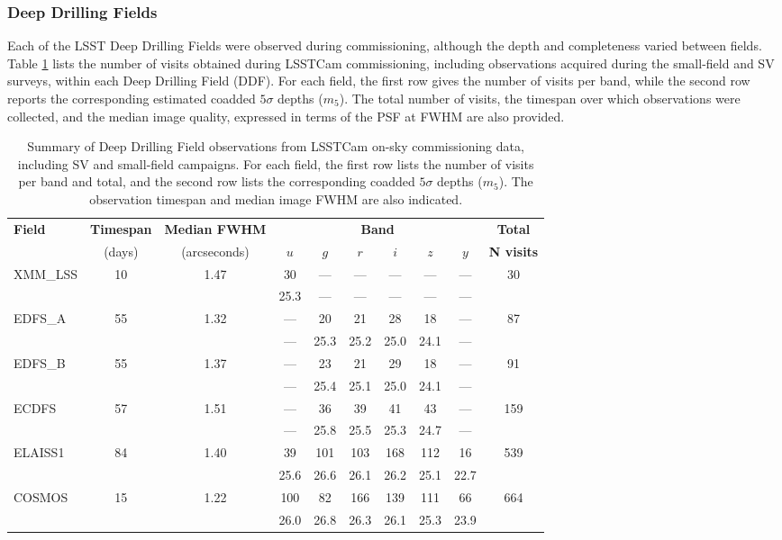 \subsubsection{Deep Drilling Fields}
Each of the LSST Deep Drilling Fields were observed during commissioning, although the depth and completeness  varied between fields.
Table \ref{tab:sv_ddf_summary}  lists the number of visits obtained during LSSTCam commissioning, including observations acquired during the  small-field  and SV surveys, within each Deep Drilling Field (DDF).
For each field, the first row gives the number of visits per band, while the second row reports the corresponding estimated coadded $5\sigma$ depths ($m_5$).
The total number of visits, the timespan over which observations were collected, and the median image quality, expressed in terms of the PSF at FWHM are also provided.
\begin{table}[htb]
\centering
\renewcommand{\arraystretch}{1.2}
\begin{tabular}{lccccccccc}
\toprule
\textbf{Field} &
\textbf{Timespan} &
\textbf{Median FWHM} &
\multicolumn{6}{c}{\textbf{Band}} &
\textbf{Total} \\
\cmidrule(lr){4-9}
 & (days) & (arcseconds) & $u$ & $g$ & $r$ & $i$ & $z$ & $y$ & \textbf{N visits} \\
\midrule
XMM\_LSS  & 10 & 1.47 & 30 & — & — & — & — & — & 30 \\
           &    &      & 25.3 & — & — & — & — & — &  \\
\addlinespace
EDFS\_A   & 55 & 1.32 & — & 20 & 21 & 28 & 18 & — & 87 \\
           &    &      & — & 25.3 & 25.2 & 25.0 & 24.1 & — &  \\
\addlinespace
EDFS\_B   & 55 & 1.37 & — & 23 & 21 & 29 & 18 & — & 91 \\
           &    &      & — & 25.4 & 25.1 & 25.0 & 24.1 & — &  \\
\addlinespace
ECDFS     & 57 & 1.51 & — & 36 & 39 & 41 & 43 & — & 159 \\
                 &      &         & — & 25.8 & 25.5 & 25.3 & 24.7 & — &  \\
\addlinespace
ELAISS1   & 84 & 1.40 & 39    & 101 & 103 & 168 & 112 & 16 & 539 \\
                 &       &         & 25.6 & 26.6&  26.1 &  26.2 &  25.1 & 22.7 & \\
\addlinespace
COSMOS    & 15 & 1.22 & 100 & 82 & 166 & 139 & 111 & 66 & 664 \\
                    &      &        & 26.0 & 26.8 & 26.3 & 26.1 & 25.3 & 23.9 &  \\
\bottomrule

\end{tabular}
\caption{Summary of Deep Drilling Field observations from LSSTCam on-sky commissioning data, including SV and small-field campaigns. For each field, the first row lists the number of visits per band and total, and the second row lists the corresponding coadded $5\sigma$ depths ($m_5$). The observation timespan and median image FWHM are also indicated.}
\label{tab:sv_ddf_summary}
\end{table}

